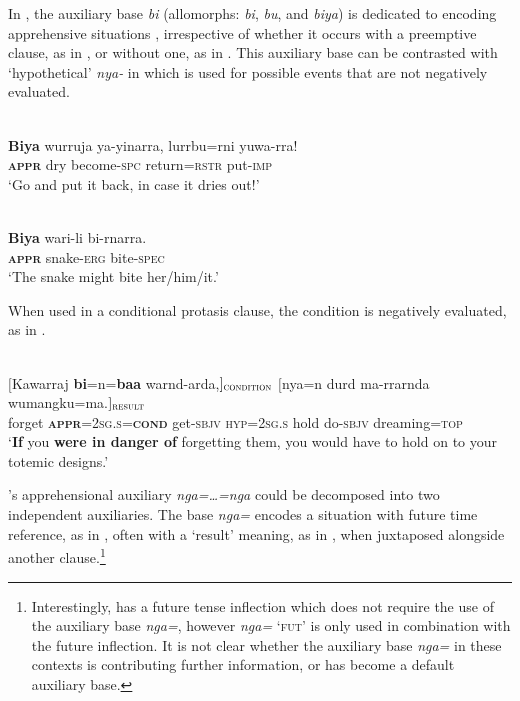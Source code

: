 \documentclass[output=paper,colorlinks,citecolor=brown]{langscibook}
\begin{document}

In , the auxiliary base \textit{bi} (allomorphs: \textit{bi}, \textit{bu}, and \textit{biya}) is dedicated to encoding apprehensive situations \citep[104]{osgarby_verbal_2018}, irrespective of whether it occurs with a preemptive clause, as in , or without one, as in . This auxiliary base can be contrasted with `hypothetical' \textit{nya-} in  which is used for possible events that are not negatively evaluated.

\ea 
{} \\
\gll \textbf{Biya} wurruja ya-yinarra, lurrbu=rni yuwa-rra! \\
\textsc{\textbf{appr}} dry become-\textsc{spc} return=\textsc{rstr} put-\textsc{imp} \\
\glt `Go and put it back, in case it dries out!'
\label{ex:bro49}
\z

\ea 
{} \\
\gll \textbf{Biya} wari-li bi-rnarra. \\
\textbf{\textsc{appr}} snake-\textsc{erg} bite-\textsc{spec} \\
\glt `The snake might bite her/him/it.'
\label{ex:bro50}
\z

When used in a conditional protasis clause, the condition is negatively evaluated, as in .



\ea 
{} \\
\gll $[$Kawarraj \textbf{bi}=n=\textbf{baa} {warnd-arda,$]_\textnormal{\textsc{condition}}$ \hspace*{2cm}} $[$nya=n durd ma-rrarnda wumangku=ma.$]_\textnormal{\textsc{result}}$ \\
forget \textsc{\textbf{appr}=2sg.s=\textbf{cond}} get-\textsc{sbjv} \textsc{hyp=2sg.s} hold do-\textsc{sbjv} dreaming=\textsc{top} \\
\glt `\textbf{If} you \textbf{were in danger of} forgetting them, you would have to hold on to your totemic designs.'
\label{ex:bro51}
\z


's apprehensional auxiliary \textit{nga=\ldots=nga} could be decomposed into two independent auxiliaries. The base \textit{nga=} encodes a situation with future time reference, as in , often with a `result' meaning, as in , when juxtaposed alongside another clause.\footnote{Interestingly,  has a future tense inflection which does not require the use of the auxiliary base \textit{nga=}, however \textit{nga=} \textsc{`fut'} is only used in combination with the future inflection. It is not clear whether the auxiliary base \textit{nga=} in these contexts is contributing further information, or has become a default auxiliary base.}
\end{document}
